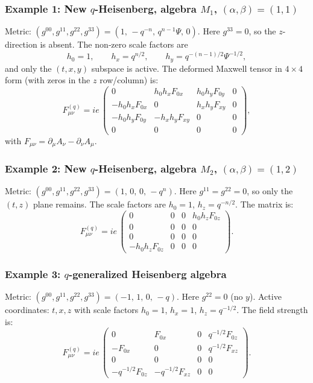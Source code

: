 \documentclass[12pt,a4paper]{article}
\theoremstyle{plain}
\theoremstyle{definition}
\begin{document}
\subsubsection*{Example 1: New \(q\)-Heisenberg, algebra \(M_1\), \((\alpha,\beta)=(1,1)\)}
Metric: \((g^{00},g^{11},g^{22},g^{33}) = (1,\,-q^{-n},\,q^{n-1}\Psi,\,0)\).  
Here \(g^{33}=0\), so the \(z\)-direction is absent. The non‑zero scale factors are
\[
h_0 = 1,\qquad h_x = q^{n/2},\qquad h_y = q^{-(n-1)/2}\Psi^{-1/2},
\]
and only the \((t,x,y)\) subspace is active. The deformed Maxwell tensor in \(4\times4\) form (with zeros in the \(z\) row/column) is:
\[
F_{\mu\nu}^{(q)} = ie\,
\begin{pmatrix}
0 & h_0 h_x F_{0x} & h_0 h_y F_{0y} & 0 \\
-h_0 h_x F_{0x} & 0 & h_x h_y F_{xy} & 0 \\
-h_0 h_y F_{0y} & -h_x h_y F_{xy} & 0 & 0 \\
0 & 0 & 0 & 0
\end{pmatrix},
\]
with \(F_{\mu\nu}=\partial_\mu A_\nu-\partial_\nu A_\mu\).

\subsubsection*{Example 2: New \(q\)-Heisenberg, algebra \(M_2\), \((\alpha,\beta)=(1,2)\)}
Metric: \((g^{00},g^{11},g^{22},g^{33}) = (1,\,0,\,0,\,-q^{n})\).  
Here \(g^{11}=g^{22}=0\), so only the \((t,z)\) plane remains. The scale factors are \(h_0=1\), \(h_z=q^{-n/2}\). The matrix is:
\[
F_{\mu\nu}^{(q)} = ie\,
\begin{pmatrix}
0 & 0 & 0 & h_0 h_z F_{0z} \\
0 & 0 & 0 & 0 \\
0 & 0 & 0 & 0 \\
-h_0 h_z F_{0z} & 0 & 0 & 0
\end{pmatrix}.
\]

\subsubsection*{Example 3: \(q\)-generalized Heisenberg algebra}
Metric: \((g^{00},g^{11},g^{22},g^{33}) = (-1,\,1,\,0,\,-q)\).  
Here \(g^{22}=0\) (no \(y\)). Active coordinates: \(t,x,z\) with scale factors
\(h_0=1\), \(h_x=1\), \(h_z=q^{-1/2}\). The field strength is:
\[
F_{\mu\nu}^{(q)} = ie\,
\begin{pmatrix}
0 & F_{0x} & 0 & q^{-1/2}F_{0z} \\
-F_{0x} & 0 & 0 & q^{-1/2}F_{xz} \\
0 & 0 & 0 & 0 \\
-q^{-1/2}F_{0z} & -q^{-1/2}F_{xz} & 0 & 0
\end{pmatrix}.
\]
\end{document}
